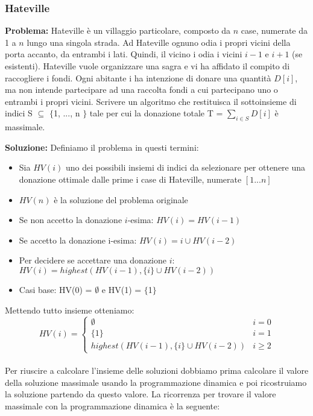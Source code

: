 \documentclass[../cheatSheetAlgoritmi.tex]{subfiles}
\begin{document}
\subsubsection{Hateville}
\textbf{Problema:} Hateville è un villaggio particolare, composto da $n$ case, numerate da 1 a $n$ lungo una singola strada. Ad Hateville ognuno odia i propri vicini della porta accanto, da entrambi i lati. Quindi, il vicino i odia i vicini $i-1$ e $i+1$ (se esistenti).
Hateville vuole organizzare una sagra e vi ha affidato il compito di
raccogliere i fondi. Ogni abitante i ha intenzione di donare una quantità $D[i]$, ma non intende partecipare ad una raccolta fondi a cui partecipano uno o entrambi i propri vicini. Scrivere un algoritmo che restituisca il sottoinsieme di indici S  $\subseteq$ $\{$1, ..., n $\}$ tale per cui la donazione totale T = $\sum\limits_{i \in S} {D[i]}$ è massimale. 
\newpage
\begin{flushleft}
\textbf{Soluzione:} Definiamo il problema in questi termini: 
\end{flushleft}
\begin{itemize}
	\item Sia $HV(i)$ uno dei possibili insiemi di indici da selezionare per ottenere una donazione ottimale dalle prime i case di Hateville, numerate $[1...n]$
	\item $HV(n)$ è la soluzione del problema originale
	\item Se non accetto la donazione $i$-esima: $HV(i) = HV(i-1)$
	\item Se accetto la donazione i-esima: $HV(i) = i \cup HV(i-2)$
	\item Per decidere se accettare una donazione $i$: $HV(i) = highest(HV(i -1),  \{i\} \cup HV(i-2))$
	\item Casi base: HV(0) = $\emptyset$ e HV(1) = $\{$1$\}$ \\
\end{itemize} 
Mettendo tutto insieme otteniamo:
\begin{equation*}
  	HV(i) =\begin{cases}
    	\emptyset & \text{$i = 0$}\\
    	\{1\} & \text{$i = 1$}\\
    	highest(HV(i -1), \{i\} \cup HV(i-2)) & \text{$i \ge 2$}
  	\end{cases}
\end{equation*} \\
Per riuscire a calcolare l'insieme delle soluzioni dobbiamo prima calcolare il valore della soluzione massimale usando la programmazione dinamica e poi ricostruiamo la soluzione partendo da questo valore. La ricorrenza per trovare il valore massimale con la programmazione dinamica è la seguente:
\end{document}
